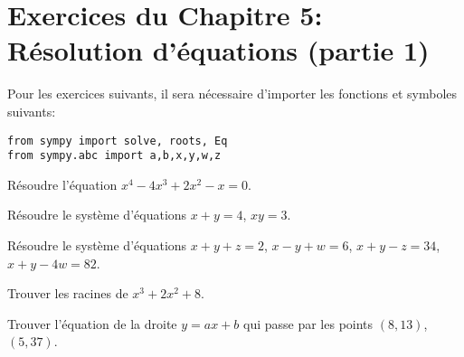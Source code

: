 
\section*{Exercices du Chapitre 5: Résolution d'équations (partie 1)}

Pour les exercices suivants, il sera nécessaire d'importer les fonctions
et symboles suivants:
\begin{verbatim}
from sympy import solve, roots, Eq
from sympy.abc import a,b,x,y,w,z
\end{verbatim}

\begin{exercice}
    Résoudre l'équation $x^4-4x^3+2x^2-x=0$.
\end{exercice}

\begin{exercice}
    Résoudre le système d'équations $x+y=4$, $xy=3$.
\end{exercice}

\begin{exercice}
Résoudre le système d'équations $x+y+z=2$, $x-y+w=6$, $x+y-z=34$, $x+y-4w=82$.
\end{exercice}

\begin{exercice}
    Trouver les racines de $x^3 + 2x^2 + 8$.
\end{exercice}

\begin{exercice}
Trouver l'équation de la droite $y=ax+b$ qui passe par les points
$(8,13)$, $(5,37)$.
\end{exercice}

